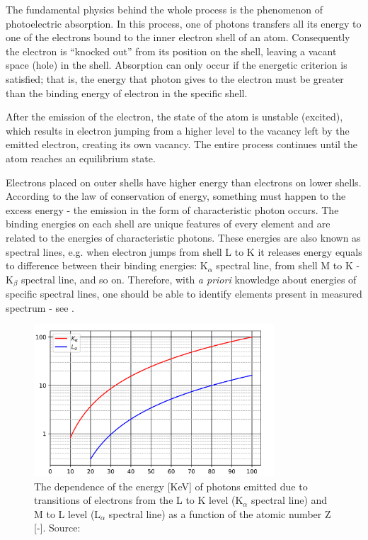 The fundamental physics behind the whole process is the phenomenon of photoelectric absorption.
In this process, one of photons transfers all its energy to one of the electrons bound to the inner electron shell of an atom. 
Consequently the electron is ``knocked out'' from its position on the shell, leaving a vacant space (hole) in the shell. 
Absorption can only occur if the energetic criterion is satisfied; that is, the energy that photon gives to the electron must be greater than the binding energy of electron in the specific shell.

After the emission of the electron, the state of the atom is unstable (excited), which results in electron jumping from a higher level to the vacancy left by the emitted electron, creating its own vacancy.
The entire process continues until the atom reaches an equilibrium state.

Electrons placed on outer shells have higher energy than electrons on lower shells. 
According to the law of conservation of energy, something must happen to the excess energy - the emission in the form of characteristic photon occurs. 
The binding energies on each shell are unique features of every element and are related to the energies of characteristic photons.
These energies are also known as spectral lines, e.g. when electron jumps from shell L to K it releases energy equals to difference between their binding energies: K$_\alpha$ spectral line, from shell M to K - K$_\beta$ spectral line, and so on.
Therefore, with \emph{a priori} knowledge about energies of specific spectral lines, one should be able to identify elements present in measured spectrum - see .

\begin{figure}[h] 
  \centering     
  \includegraphics[width=0.8\textwidth]{img/dependence_of_photons_energy.png} 
  \caption{The dependence of the energy [KeV] of photons  emitted due to transitions of electrons from the L to K level (K$_\alpha$ spectral line) and M to L level (L$_\alpha$ spectral line) as a function of the atomic number Z [-]. Source: \cite{Lach2022}}
  \label{fig:photons_energy}
\end{figure}

